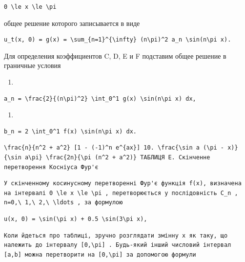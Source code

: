 \documentclass[
  ukrainian,
]{article}
\providecommand{\tightlist}{%
  \setlength{\itemsep}{0pt}\setlength{\parskip}{0pt}}
\begin{document}
\begin{verbatim}
0 \le x \le \pi
\end{verbatim}

общее решение которого записывается в виде

\begin{verbatim}
u_t(x, 0) = g(x) = \sum_{n=1}^{\infty} (n\pi)^2 a_n \sin(n\pi x).
\end{verbatim}

Для определения коэффициентов C, D, E и F подставим общее решение в
граничные условия

\begin{enumerate}
\def\labelenumi{\arabic{enumi}.}
\tightlist
\item
\end{enumerate}

\begin{verbatim}
a_n = \frac{2}{(n\pi)^2} \int_0^1 g(x) \sin(n\pi x) dx,
\end{verbatim}

\begin{enumerate}
\def\labelenumi{\arabic{enumi}.}
\setcounter{enumi}{8}
\tightlist
\item
\end{enumerate}

\begin{verbatim}
b_n = 2 \int_0^1 f(x) \sin(n\pi x) dx.
\end{verbatim}

\begin{verbatim}
\frac{n}{n^2 + a^2} [1 - (-1)^n e^{ax}] 10. \frac{\sin a (\pi - x)}{\sin a\pi} \frac{2n}{\pi (n^2 + a^2)} ТАБЛИЦЯ E. Скінченне перетворення Косніуса Фур'є
\end{verbatim}

\begin{verbatim}
У скінченному косинусному перетворенні Фур'є функція f(x), визначена на інтервалі 0 \le x \le \pi , перетворюється у послідовність C_n , n=0,\ 1,\ 2,\ \ldots , за формулою
\end{verbatim}

\begin{verbatim}
u(x, 0) = \sin(\pi x) + 0.5 \sin(3\pi x),
\end{verbatim}

\begin{verbatim}
Коли йдеться про таблиці, зручно розглядати змінну x як таку, що належить до інтервалу [0,\pi] . Будь-який інший числовий інтервал [a,b] можна перетворити на [0,\pi] за допомогою формули
\end{verbatim}
\end{document}
